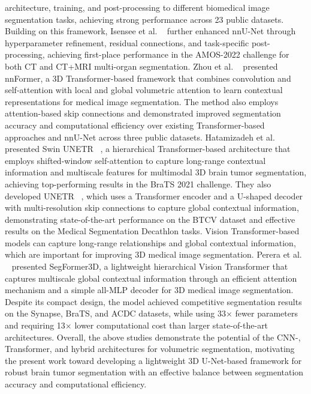 \documentclass[a4paper,fleqn]{cas-dc}
\begin{document}
architecture, training, and post-processing to different biomedical image segmentation tasks, achieving strong performance across 23 public datasets. Building on this framework, Isensee et al. ~\cite{isensee2023extending} further enhanced nnU-Net through hyperparameter refinement, residual connections, and task-specific post-processing, achieving first-place performance in the AMOS-2022 challenge for both CT and CT+MRI multi-organ segmentation. Zhou et al. ~\cite{zhou2023nnformer} presented nnFormer, a 3D Transformer-based framework that combines convolution and self-attention with local and global volumetric attention to learn contextual representations for medical image segmentation. The method also employs attention-based skip connections and demonstrated improved segmentation accuracy and computational efficiency over existing Transformer-based approaches and nnU-Net across three public datasets. Hatamizadeh et al. presented Swin UNETR ~\cite{hatamizadeh2021swin}, a hierarchical Transformer-based architecture that employs shifted-window self-attention to capture long-range contextual information and multiscale features for multimodal 3D brain tumor segmentation, achieving top-performing results in the BraTS 2021 challenge. They also developed UNETR ~\cite{hatamizadeh2022unetr}, which uses a Transformer encoder and a U-shaped decoder with multi-resolution skip connections to capture global contextual information, demonstrating state-of-the-art performance on the BTCV dataset and effective results on the Medical Segmentation Decathlon tasks. Vision Transformer-based models can capture long-range relationships and global contextual information, which are important for improving 3D medical image segmentation. Perera et al. ~\cite{perera2024segformer3d} presented SegFormer3D, a lightweight hierarchical Vision Transformer that captures multiscale global contextual information through an efficient attention mechanism and a simple all-MLP decoder for 3D medical image segmentation. Despite its compact design, the model achieved competitive segmentation results on the Synapse, BraTS, and ACDC datasets, while using 33× fewer parameters and requiring 13× lower computational cost than larger state-of-the-art architectures. Overall, the above studies demonstrate the potential of the CNN-, Transformer, and hybrid architectures for volumetric segmentation, motivating the present work toward developing a lightweight 3D U-Net-based framework for robust brain tumor segmentation with an effective balance between segmentation accuracy and computational efficiency.
\end{document}
